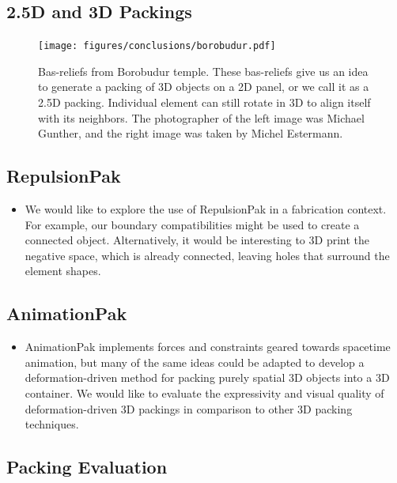 \subsection{2.5D and 3D Packings}

\begin{figure}
\centering
\texttt{[image: figures/conclusions/borobudur.pdf]}
\caption[Element Arrangements in Bas-Reliefs]
{ \label{borobudur} 
\newtext
{
Bas-reliefs from Borobudur temple. These
bas-reliefs give us an idea to generate a packing of 3D objects on a 2D panel,
or we call it as a 2.5D packing.
Individual element can still rotate in 3D to align itself with its neighbors.
The photographer of the left image was Michael Gunther, and the right image was taken by Michel Estermann.
}
}
\end{figure}



\subsection{RepulsionPak}


\begin{itemize}

\item {} 
We would like to explore the use of RepulsionPak in a fabrication context.
      For example, our boundary compatibilities might be used to create a connected object.
      Alternatively, it would be interesting to 3D print the 
      negative space, which is already connected,
	  leaving holes that surround the element shapes.

\end{itemize}

\subsection{AnimationPak}


\begin{itemize}

\item {}
AnimationPak implements forces and constraints geared towards 
	spacetime animation, but many of the same ideas could be adapted
	to develop a deformation-driven method for packing purely spatial
	3D objects into a 3D container.  We would like to evaluate the
	expressivity and visual quality of deformation-driven 3D packings 
	in comparison to other 3D packing techniques.



\end{itemize}

\subsection{Packing Evaluation}


